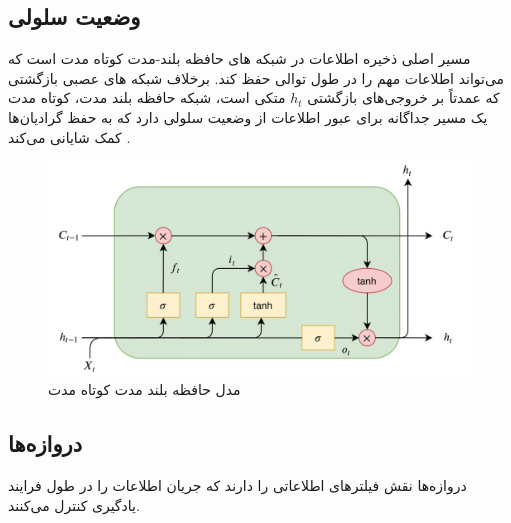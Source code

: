 \subsection{وضعیت سلولی}
مسیر اصلی ذخیره اطلاعات در  شبکه های حافظه بلند-مدت کوتاه مدت است که می‌تواند اطلاعات مهم را در طول توالی حفظ کند. برخلاف شبکه های عصبی بازگشتی که عمدتاً بر خروجی‌های بازگشتی \( h_t \) متکی است،  شبکه حافظه بلند مدت، کوتاه مدت  یک مسیر جداگانه برای عبور اطلاعات از وضعیت سلولی دارد که به حفظ گرادیان‌ها کمک شایانی می‌کند
\cite{hochreiter1997long}.


 \begin{figure}[h]
	\centering
	\begin{minipage}[b]{0.7\textwidth}
		\centering
		\includegraphics[width=\textwidth]{transformer_images/lstm.png}
		\caption{مدل حافظه بلند مدت کوتاه مدت}
		\label{fig:LSTM}
	\end{minipage}
	\hfill
	
\end{figure}


\subsection{دروازه‌ها}
دروازه‌ها نقش فیلترهای اطلاعاتی را دارند که جریان اطلاعات را در طول فرایند یادگیری کنترل می‌کنند.

